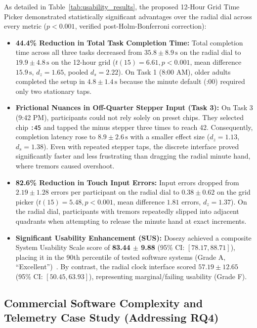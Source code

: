\documentclass[11pt,a4paper]{article}
\begin{document}
As detailed in Table~\ref{tab:usability_results}, the proposed 12-Hour Grid Time Picker demonstrated statistically significant advantages over the radial dial across every metric ($p < 0.001$, verified post-Holm-Bonferroni correction):
\begin{itemize}[leftmargin=*]
    \item \textbf{44.4\% Reduction in Total Task Completion Time:} Total completion time across all three tasks decreased from $35.8 \pm 8.9\,\text{s}$ on the radial dial to $19.9 \pm 4.8\,\text{s}$ on the 12-hour grid ($t(15) = 6.61, p < 0.001$, mean difference $15.9\,\text{s}$, $d_z = 1.65$, pooled $d_s = 2.22$). On Task 1 (8:00 AM), older adults completed the setup in $4.8 \pm 1.4\,\text{s}$ because the minute default (:00) required only two stationary taps.
    \item \textbf{Frictional Nuances in Off-Quarter Stepper Input (Task 3):} On Task 3 (9:42 PM), participants could not rely solely on preset chips. They selected chip \texttt{:45} and tapped the minus stepper three times to reach 42. Consequently, completion latency rose to $8.9 \pm 2.6\,\text{s}$ with a smaller effect size ($d_z = 1.13$, $d_s = 1.38$). Even with repeated stepper taps, the discrete interface proved significantly faster and less frustrating than dragging the radial minute hand, where tremors caused overshoot.
    \item \textbf{82.6\% Reduction in Touch Input Errors:} Input errors dropped from $2.19 \pm 1.28$ errors per participant on the radial dial to $0.38 \pm 0.62$ on the grid picker ($t(15) = 5.48, p < 0.001$, mean difference $1.81$ errors, $d_z = 1.37$). On the radial dial, participants with tremors repeatedly slipped into adjacent quadrants when attempting to release the minute hand at exact increments.
    \item \textbf{Significant Usability Enhancement (SUS):} Dosezy achieved a composite System Usability Scale score of \textbf{83.44 $\pm$ 9.88} (95\% CI: $[78.17, 88.71]$), placing it in the 90th percentile of tested software systems (Grade A, ``Excellent'')~\cite{bangor2008empirical,lewis2009factor}. By contrast, the radial clock interface scored $57.19 \pm 12.65$ (95\% CI: $[50.45, 63.93]$), representing marginal/failing usability (Grade F).
\end{itemize}

\subsection{Commercial Software Complexity and Telemetry Case Study (Addressing RQ4)}
\label{sec:commercial_comparison}
\end{document}
